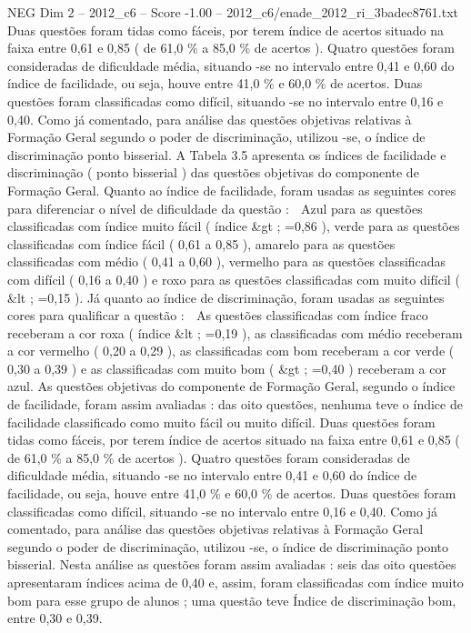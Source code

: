 \begin{textsample}{NEG Dim 2 – 2012\_c6 – Score -1.00 – 2012\_c6/enade\_2012\_ri\_3badec8761.txt}
Duas questões foram tidas como fáceis, por terem índice de acertos situado na faixa entre 0,61 e 0,85 ( de 61,0 \% a 85,0 \% de acertos ).
Quatro questões foram consideradas de dificuldade média, situando -se no intervalo entre 0,41 e 0,60 do índice de facilidade, ou seja, houve entre 41,0 \% e 60,0 \% de acertos.
Duas questões foram classificadas como difícil, situando -se no intervalo entre 0,16 e 0,40.
Como já comentado, para análise das questões objetivas relativas à Formação Geral segundo o poder de discriminação, utilizou -se, o índice de discriminação ponto bisserial.
A Tabela 3.5 apresenta os índices de facilidade e discriminação ( ponto bisserial ) das questões objetivas do componente de Formação Geral.
Quanto ao índice de facilidade, foram usadas as seguintes cores para diferenciar o nível de dificuldade da questão :  Azul para as questões classificadas com índice muito fácil ( índice \&gt ; =0,86 ), verde para as questões classificadas com índice fácil ( 0,61 a 0,85 ), amarelo para as questões classificadas com médio ( 0,41 a 0,60 ), vermelho para as questões classificadas com difícil ( 0,16 a 0,40 ) e roxo para as questões classificadas com muito difícil ( \&lt ; =0,15 ).
Já quanto ao índice de discriminação, foram usadas as seguintes cores para qualificar a questão :  As questões classificadas com índice fraco receberam a cor roxa ( índice \&lt ; =0,19 ), as classificadas com médio receberam a cor vermelho ( 0,20 a 0,29 ), as classificadas com bom receberam a cor verde ( 0,30 a 0,39 ) e as classificadas com muito bom ( \&gt ; =0,40 ) receberam a cor azul.
As questões objetivas do componente de Formação Geral, segundo o índice de facilidade, foram assim avaliadas : das oito questões, nenhuma teve o índice de facilidade classificado como muito fácil ou muito difícil.
Duas questões foram tidas como fáceis, por terem índice de acertos situado na faixa entre 0,61 e 0,85 ( de 61,0 \% a 85,0 \% de acertos ).
Quatro questões foram consideradas de dificuldade média, situando -se no intervalo entre 0,41 e 0,60 do índice de facilidade, ou seja, houve entre 41,0 \% e 60,0 \% de acertos.
Duas questões foram classificadas como difícil, situando -se no intervalo entre 0,16 e 0,40.
Como já comentado, para análise das questões objetivas relativas à Formação Geral segundo o poder de discriminação, utilizou -se, o índice de discriminação ponto bisserial.
Nesta análise as questões foram assim avaliadas : seis das oito questões apresentaram índices acima de 0,40 e, assim, foram classificadas com índice muito bom para esse grupo de alunos ; uma questão teve Índice de discriminação bom, entre 0,30 e 0,39.

\end{textsample}

